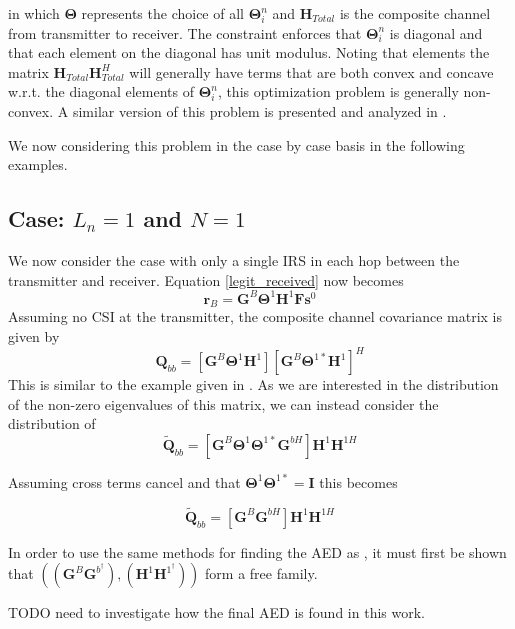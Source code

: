 \documentclass[12pt,a4paper]{report}
\begin{document}
in which $\boldsymbol{\Theta}$ represents the choice of all $\boldsymbol{\Theta}^n_i$ and $\mathbf{H}_{Total}$ is the composite channel from transmitter to receiver. The constraint enforces that $\boldsymbol{\Theta}^n_i$ is diagonal and that each element on the diagonal has unit modulus. 
Noting that elements the matrix  $\mathbf{H}_{Total}\mathbf{H}_{Total}^H$ will generally have terms that are both convex and concave w.r.t. the diagonal elements of $\boldsymbol{\Theta}^n_i$, this optimization problem is generally non-convex. A similar version of this problem is presented and analyzed in \cite{wu2019intelligent}.
\par
We now considering this problem in the case by case basis in the following examples. 


\subsection{Case: $L_n=1$ and $N=1$}
We now consider the case with only a single IRS in each hop between the transmitter and receiver. 
Equation \ref{legit_received} now becomes 
	\begin{equation}
\mathbf{r}_{B} =  \mathbf{G}^{B}\boldsymbol{\Theta}^{1}\mathbf{H}^{1}\mathbf{F}\mathbf{s}^0
\end{equation}
Assuming no CSI at the transmitter, the composite channel covariance matrix is given by 
\begin{equation}
\mathbf{Q}_{bb} = [\mathbf{G}^{B}\boldsymbol{\Theta}^{1}\mathbf{H}^{1}][\mathbf{G}^{B}\boldsymbol{\Theta}^{1*}\mathbf{H}^{1}]^H
\end{equation}
This is similar to the example given in \cite[Section 4.10]{muller2013applications}. As we are interested in the distribution of the non-zero eigenvalues of this matrix, we can instead consider the distribution of 
\begin{equation}
\tilde{\mathbf{Q}}_{bb} = [\mathbf{G}^{B}\boldsymbol{\Theta}^{1} \boldsymbol{\Theta}^{1*}\mathbf{G}^{bH}]\mathbf{H}^{1}\mathbf{H}^{1H}
\end{equation}

Assuming cross terms cancel and that $\boldsymbol{\Theta}^{1}\boldsymbol{\Theta}^{1*} = \mathbf{I}$ this becomes

\begin{equation}
\tilde{\mathbf{Q}}_{bb} = [\mathbf{G}^{B}\mathbf{G}^{bH}]\mathbf{H}^{1}\mathbf{H}^{1H}
\end{equation}

In order to use the same methods for finding the AED as \cite[Section 4.10]{muller2013applications}, it must first be shown that $\left(\left( \mathbf{G}^{B}\mathbf{G}^{b^\dagger }\right)
,\left( \mathbf{H}^{1}\mathbf{H}^{1^\dagger} \right)
\right)$
form a free family. 
\par
TODO need to investigate how the final AED is found in this work.
\end{document}
